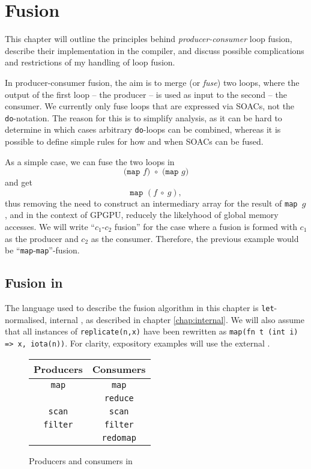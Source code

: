 \chapter{Fusion}
\label{chap:fusion}

This chapter will outline the principles behind
\textit{producer-consumer} loop fusion, describe their implementation
in the \LO{} compiler, and discuss possible complications and
restrictions of my handling of loop fusion.

In producer-consumer fusion, the aim is to merge (or \textit{fuse})
two loops, where the output of the first loop -- the producer -- is
used as input to the second -- the consumer.  We currently only fuse
loops that are expressed via SOACs, not the \texttt{do}-notation.  The
reason for this is to simplify analysis, as it can be hard to
determine in which cases arbitrary \texttt{do}-loops can be combined,
whereas it is possible to define simple rules for how and when SOACs
can be fused.

As a simple case, we can fuse the two loops in
\[
\texttt{(map~$f$)~$\circ$~(map~$g$)}
\]
and get
\[
\texttt{map~$(f~\circ~g)$},
\]
thus removing the need to construct an intermediary array for the
result of \texttt{map~$g$}, and in the context of GPGPU, reducely the
likelyhood of global memory accesses.  We will write ``$c_{1}$-$c_{2}$
fusion'' for the case where a fusion is formed with $c_{1}$ as the
producer and $c_{2}$ as the consumer.  Therefore, the previous example
would be ``\texttt{map}-\texttt{map}''-fusion.

\section{Fusion in \LO{}}

The language used to describe the fusion algorithm in this chapter is
\texttt{let}-normalised, internal \LO{}, as described in chapter
\ref{chap:internal}.  We will also assume that all instances of
\texttt{replicate(n,x)} have been rewritten as \texttt{map(fn t (int
  i) => x, iota(n))}.  For clarity, expository examples will use the
external \LO{}.

\begin{figure}
  \begin{center}
    \begin{tabular}{c|c}
      \textbf{Producers} & \textbf{Consumers} \\\hline
      \texttt{map} & \texttt{map} \\\hline
      & \texttt{reduce} \\\hline
      \texttt{scan} & \texttt{scan} \\\hline
      \texttt{filter} & \texttt{filter} \\\hline
      & \texttt{redomap} \\\hline
    \end{tabular}
  \end{center}
  \caption{Producers and consumers in \LO}
  \label{fig:producers-consumers}
\end{figure}

